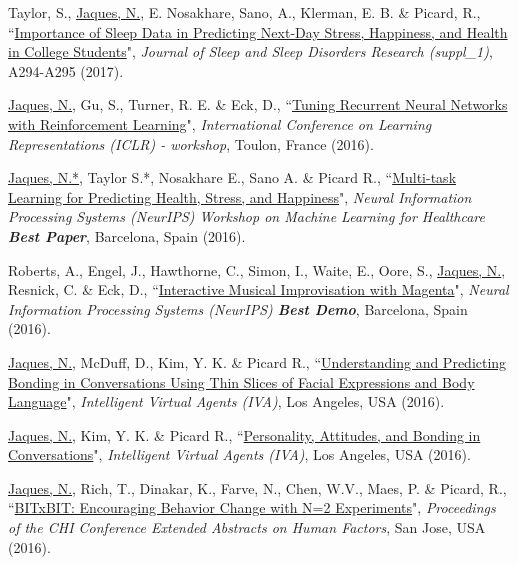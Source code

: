 \documentclass[paper=letter,fontsize=11pt]{scrartcl} %
\newcommand{\PaperEntry}[6]{
		\noindent #1, ``\href{#6}{#2}", \textit{#3}, #4 (#5).}
\begin{document}
\begin{etaremune}
\item \PaperEntry{Taylor, S., \underline{Jaques, N.}, E. Nosakhare, Sano, A., Klerman, E. B. \& Picard, R.}{Importance of Sleep Data in Predicting Next-Day Stress, Happiness, and Health in College Students}{Journal of Sleep and Sleep Disorders Research (suppl\_1)}{A294-A295}{2017}{https://affect.media.mit.edu/pdfs/17.Taylor-etal-MoodPrediction-SLEEP2017-Poster.pdf}

\item \PaperEntry{\underline{Jaques, N.}, Gu, S., Turner, R. E. \& Eck, D.}{Tuning Recurrent Neural Networks with Reinforcement Learning}{International Conference on Learning Representations (ICLR) - workshop}{Toulon, France}{2016}{https://openreview.net/pdf?id=Syyv2e-Kx}

\item \PaperEntry{\underline{Jaques, N.*}, Taylor S.*, Nosakhare E., Sano A. \& Picard R.}{Multi-task Learning for Predicting Health, Stress, and Happiness}{Neural Information Processing Systems (NeurIPS) Workshop on Machine Learning for Healthcare \textbf{Best Paper}}{Barcelona, Spain}{2016}{https://pdfs.semanticscholar.org/b228/7a406985980515d5cc63e9b37fb17c5186f8.pdf}

\item \PaperEntry{Roberts, A., Engel, J., Hawthorne, C., Simon, I., Waite, E., Oore, S., \underline{Jaques, N.}, Resnick, C. \& Eck, D.}{Interactive Musical Improvisation with Magenta}{Neural Information Processing Systems (NeurIPS) \textbf{Best Demo}}{Barcelona, Spain}{2016}{https://nips.cc/Conferences/2016/Schedule?showEvent=6307}

\item \PaperEntry{\underline{Jaques, N.}, McDuff, D., Kim, Y. K. \& Picard R.}{Understanding and Predicting Bonding in Conversations Using Thin Slices of Facial Expressions and Body Language}{Intelligent Virtual Agents (IVA)}{Los Angeles, USA}{2016}{http://affect.media.mit.edu/pdfs/16.Jaques-IVAbonding.pdf}

\item \PaperEntry{\underline{Jaques, N.}, Kim, Y. K. \& Picard R.}{Personality, Attitudes, and Bonding in Conversations}{Intelligent Virtual Agents (IVA)}{Los Angeles, USA}{2016}{http://affect.media.mit.edu/pdfs/16.Jaques-IVApersonality.pdf}

\item \PaperEntry{\underline{Jaques, N.}, Rich, T., Dinakar, K., Farve, N., Chen, W.V., Maes, P. \& Picard, R.}{BITxBIT: Encouraging Behavior Change with N=2 Experiments}{Proceedings of the CHI Conference Extended Abstracts on Human Factors}{San Jose, USA}{2016}{http://affect.media.mit.edu/pdfs/16.Jaques-etal-CHI.pdf}


\end{etaremune}
\end{document}
